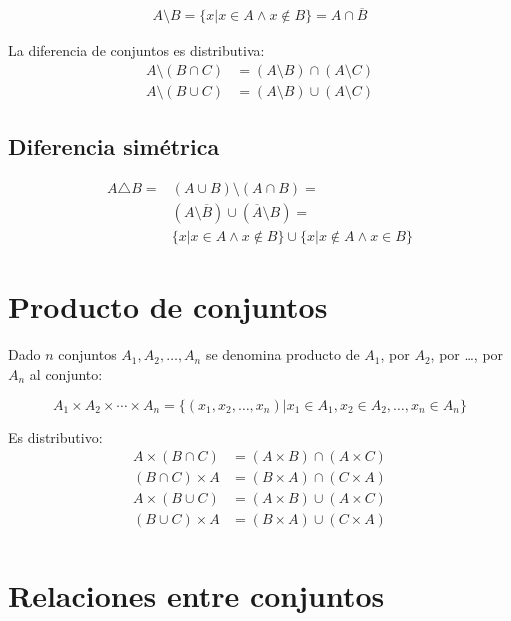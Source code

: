 \begin{align*}
A \setminus   B = \{x | x \in A \wedge x \notin B \} = A \cap \overline{B} 
\end{align*}


La diferencia de conjuntos es distributiva:
\begin{align*}
A \setminus  (B \cap C) &= (A \setminus  B) \cap (A \setminus C) \\
A \setminus  (B \cup C) &= (A \setminus B) \cup (A \setminus C) 
\end{align*}

\subsection{Diferencia simétrica}

\begin{align*}
A \triangle B = & (A \cup B) \setminus{} (A \cap B) = \\ 
& (A \setminus  \overline{B}) \cup (\overline{A} \setminus  B) = \\ 
& \{ x | x \in A \wedge x \notin B\} \cup \{ x | x \notin A \wedge x \in B\}
\end{align*}



\section{Producto de conjuntos}

Dado $n$ conjuntos $A_1,A_2,\ldots,A_n$ se denomina producto de $A_1$, por $A_2$, por \ldots, por $A_n$ al conjunto:

\[
A_1 \times A_2 \times \cdots \times A_n = \{(x_1,x_2,\ldots,x_n)|x_1 \in A_1, x_2 \in A_2,\ldots,x_n \in A_n\}
\]

Es distributivo:
\begin{align*}
A \times (B \cap C) &= (A \times B) \cap (A \times C) \\
(B \cap C) \times A &= (B \times A) \cap (C \times A) \\
A \times (B \cup C) &= (A \times B) \cup (A \times C) \\
(B \cup C) \times A &= (B \times A) \cup (C \times A) \\
\end{align*}

\section{Relaciones entre conjuntos}

